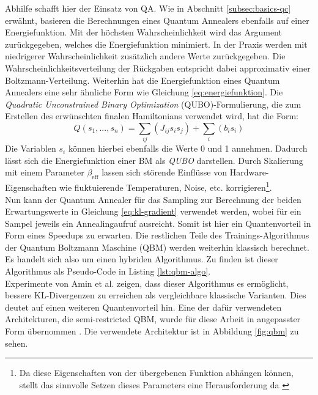 Abhilfe schafft hier der Einsatz von QA. Wie in Abschnitt \ref{subsec:basics-qc} erwähnt, basieren die Berechnungen eines Quantum Annealers ebenfalls auf einer Energiefunktion. Mit der höchsten Wahrscheinlichkeit wird das Argument zurückgegeben, welches die Energiefunktion minimiert. In der Praxis werden mit niedrigerer Wahrscheinlichkeit zusätzlich andere Werte zurückgegeben. Die Wahrscheinlichkeitsverteilung der Rückgaben entspricht dabei approximativ einer Boltzmann-Verteilung. Weiterhin hat die Energiefunktion eines Quantum Annealers eine sehr ähnliche Form wie Gleichung \ref{eq:energiefunktion}. Die \emph{Quadratic Unconstrained Binary Optimization} (QUBO)-Formulierung, die zum Erstellen des erwünschten finalen Hamiltonians verwendet wird, hat die Form:
\begin{equation} \label{eq:qubo}
	Q(s_1, ..., s_n) = \sum_{ij}(J_{ij} s_i s_j) + \sum_i(b_i s_i)
\end{equation}
Die Variablen $s_i$ können hierbei ebenfalls die Werte 0 und 1 annehmen. Dadurch lässt sich die Energiefunktion einer BM als \emph{QUBO} darstellen. Durch Skalierung mit einem Parameter $\beta_{\text{eff}}$ lassen sich störende Einflüsse von Hardware-Eigenschaften wie fluktuierende Temperaturen, Noise, etc. korrigieren\footnote{Da diese Eigenschaften von der übergebenen Funktion abhängen können, stellt das sinnvolle Setzen dieses Parameters eine Herausforderung da \cite{Amin15, Korenkevych16, Adachi15, Benedetti16, Benedetti17}}.~\cite{Amin18, venegas2018cross, Adachi15, Benedetti16, Benedetti17} \\
Nun kann der Quantum Annealer für das Sampling zur Berechnung der beiden Erwartungswerte in Gleichung \ref{eq:kl-gradient} verwendet werden, wobei für ein Sampel jeweils ein Annealingaufruf ausreicht. Somit ist hier ein Quantenvorteil in Form eines Speedups zu erwarten. Die restlichen Teile des Trainings-Algorithmus der Quantum Boltzmann Maschine (QBM) werden weiterhin klassisch berechnet. Es handelt sich also um einen hybriden Algorithmus. Zu finden ist dieser Algorithmus als Pseudo-Code in Listing \ref{lst:qbm-algo}.~\cite{Amin18}\\



\noindent Experimente von Amin et al. \cite{Amin18} zeigen, dass dieser Algorithmus es ermöglicht, bessere KL-Divergenzen zu erreichen als vergleichbare klassische Varianten. Dies deutet auf einen weiteren Quantenvorteil hin. Eine der dafür verwendeten Architekturen, die semi-restricted QBM, wurde für diese Arbeit in angepasster Form übernommen \cite{Amin18}. Die verwendete Architektur ist in Abbildung \ref{fig:qbm} zu sehen.

